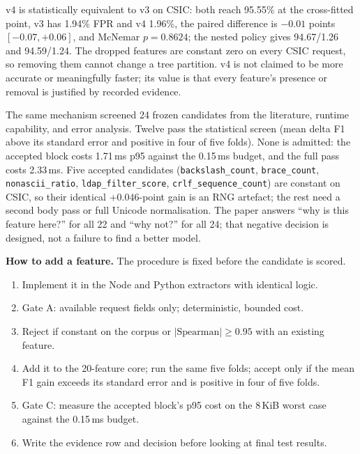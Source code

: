 \documentclass[conference]{IEEEtran}
\newcommand{\feat}[1]{\texttt{#1}}
\begin{document}
v4 is statistically equivalent to v3 on CSIC: both reach 95.55\% at the cross-fitted point, v3 has 1.94\% FPR and v4 1.96\%, the paired difference is $-0.01$ points $[-0.07,+0.06]$, and McNemar $p=0.8624$; the nested policy gives 94.67/1.26 and 94.59/1.24. The dropped features are constant zero on every CSIC request, so removing them cannot change a tree partition. v4 is not claimed to be more accurate or meaningfully faster; its value is that every feature's presence or removal is justified by recorded evidence.

The same mechanism screened 24 frozen candidates from the literature, runtime capability, and error analysis. Twelve pass the statistical screen (mean delta F1 above its standard error and positive in four of five folds). None is admitted: the accepted block costs 1.71\,ms p95 against the 0.15\,ms budget, and the full pass costs 2.33\,ms. Five accepted candidates (\feat{backslash\_count}, \feat{brace\_count}, \feat{nonascii\_ratio}, \feat{ldap\_filter\_score}, \feat{crlf\_sequence\_count}) are constant on CSIC, so their identical $+0.046$-point gain is an RNG artefact; the rest need a second body pass or full Unicode normalisation. The paper answers ``why is this feature here?'' for all 22 and ``why not?'' for all 24; that negative decision is designed, not a failure to find a better model.

\textbf{How to add a feature.} The procedure is fixed before the candidate is scored.
\begin{enumerate}
\item Implement it in the Node and Python extractors with identical logic.
\item Gate A: available request fields only; deterministic, bounded cost.
\item Reject if constant on the corpus or $|\text{Spearman}| \ge 0.95$ with an existing feature.
\item Add it to the 20-feature core; run the same five folds; accept only if the mean F1 gain exceeds its standard error and is positive in four of five folds.
\item Gate C: measure the accepted block's p95 cost on the 8\,KiB worst case against the 0.15\,ms budget.
\item Write the evidence row and decision before looking at final test results.
\end{enumerate}
\end{document}
